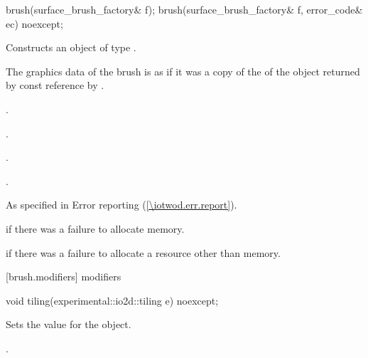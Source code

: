 %
%
%
%
%
%
%
%
\begin{itemdecl}
brush(surface_brush_factory& f);
brush(surface_brush_factory& f, error_code& ec) noexcept;
\end{itemdecl}
\begin{itemdescr}
\pnum
\effects
Constructs an object of type .

\pnum
The graphics data of the brush is as if it was a copy of the \underlyingimagesurface of the  object returned by const reference by .

\pnum
\postconditions
{}.

.

.

.

\pnum
\throws
As specified in Error reporting (\ref{\iotwod.err.report}).

\pnum
\errors
{} if there was a failure to allocate memory.

 if there was a failure to allocate a resource other than memory.
\end{itemdescr}

 [brush.modifiers]{ modifiers}

\begin{itemdecl}
void tiling(experimental::io2d::tiling e) noexcept;
\end{itemdecl}
\begin{itemdescr}
\pnum
\effects
Sets the  value for the  object.

\pnum
\postconditions
{}.
\end{itemdescr}

